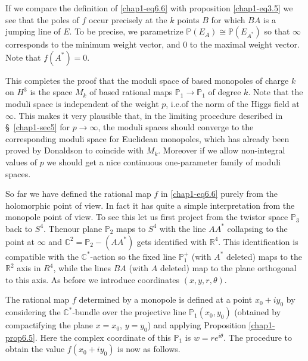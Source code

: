 If we compare the definition of \eqref{chap1-eq6.6} with proposition
\eqref{chap1-eq3.5} we see that the poles of $f$ occur precisely at
the $k$ points $B$ for which $BA$ is a jumping line of $E$. To be
precise, we parametrize $\mathbb{P}(E_{A})\cong \mathbb{P}(E_{A^{*}})$
so that $\infty$ corresponds to the minimum weight vector, and $0$ to
the maximal weight vector. Note that $f(A^{*})=0$.

This completes the proof that the moduli space of based monopoles of
charge $k$ on $H^{3}$ is the space $M_{k}$ of based rational maps
$\mathbb{P}_{1}\to \mathbb{P}_{1}$ of degree $k$. Note that the moduli
space is independent of the weight $p$, i.e.\@ of the norm of the
Higgs field at $\infty$. This makes it very plausible that, in the
limiting procedure described in \S\ \ref{chap1-sec5} for $p\to
\infty$, the moduli spaces should converge to the corresponding moduli
space for Euclidean monopoles, which has already been proved by
Donaldson \cite{chap1-key5} to coincide with $M_{k}$. Moreover if we
allow non-integral values of $p$ we should get a nice continuous
one-parameter family of moduli spaces.

So far we have defined the rational map $f$ in \eqref{chap1-eq6.6}
purely from the holomorphic point of view. In fact it has quite a
simple interpretation from the monopole point of view. To see this let
us first project from the twistor space $\mathbb{P}_{3}$ back to
$S^{4}$. Then\pageoriginale our plane $\mathbb{P}_{2}$ maps to $S^{4}$
with the line $AA^{*}$ collapsing to the point at $\infty$ and
$\mathbb{C}^{2}=\mathbb{P}_{2}-(AA^{*})$ gets identified with
$\mathbb{R}^{4}$. This identification is compatible with the
$\mathbb{C}^{*}$-action so the fixed line $\mathbb{P}^{+}_{1}$ (with
$A^{*}$ deleted) maps to the $\mathbb{R}^{2}$ axis in $R^{4}$, while
the lines $BA$ (with $A$ deleted) map to the plane orthogonal to this
axis. As before we introduce coordinates $(x,y,r,\theta)$.

The rational map $f$ determined by a monopole is defined at a point
$x_{0}+iy_{0}$ by considering the $\mathbb{C}^{*}$-bundle over the
projective line $\mathbb{P}_{1}(x_{0},y_{0})$ (obtained by
compactifying the plane $x=x_{0}$, $y=y_{0}$) and applying Proposition
\eqref{chap1-prop6.5}. Here the complex coordinate of this
$\mathbb{P}_{1}$ is $w=re^{i\theta}$. The procedure to obtain the
value $f(x_{0}+iy_{0})$ is now as follows.

